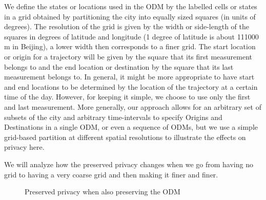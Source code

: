 \documentclass{llncs}
\begin{document}
We define the states or locations used in the ODM by the labelled cells or states in a grid obtained by partitioning the
city into equally sized squares (in units of degrees).  
The resolution of the grid is given by the width or side-length of the squares in degrees of latitude and
longitude (1 degree of latitude is about 111000 m in Beijing), a lower width then corresponds to a finer grid. 
The start location or origin for a trajectory will be given by the square that its first
measurement belongs to and the end location or destination by the square that its last
measurement belongs to. In general, it might be more appropriate to
have start and end locations to be determined by the location of the
trajectory at a certain time of the day. However, for keeping it
simple, we choose to use only the first and last measurement.
More generally, our approach allows for an arbitrary set of subsets of the city and arbitrary time-intervals to specify Origins and Destinations in a single ODM, or even a sequence of ODMs, but we use a simple grid-based partition at different spatial resolutions to illustrate the effects on privacy here.  

We will analyze how the preserved privacy changes when we go from having
no grid to having a very coarse grid and then making it finer and
finer.

\begin{figure}
  \hfil
  \caption{Preserved privacy when also preserving the ODM}
  \label{fig:OD}
\end{figure}
\end{document}
